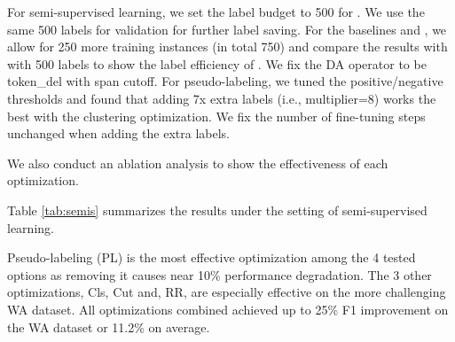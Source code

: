 For semi-supervised learning, we set the label budget to 500 for \system.
We use the same 500 labels for validation for further label saving.
For the baselines \ditto and \rot, we allow for 250 more training instances (in total 750) 
and compare the results with \system with 500 labels to show the label efficiency of \system.
We fix the DA operator to be token\_del with span cutoff.
For pseudo-labeling, we tuned the positive/negative thresholds 
 and found that adding 7x extra 
labels (i.e., multiplier=8)
works the best with the clustering optimization.
We fix the number of fine-tuning steps unchanged when adding the extra labels.




We also conduct an ablation analysis to show the effectiveness of each optimization.


Table \ref{tab:semis} summarizes the results under the setting of semi-supervised learning.

Pseudo-labeling (PL) is the most effective optimization
among the 4 tested options as removing it causes near 10\%
performance degradation. The 3 other optimizations,
Cls, Cut and, RR, are especially effective on the 
more challenging WA dataset. All optimizations combined
achieved up to 25\% F1 improvement on the WA dataset
or 11.2\% on average.




